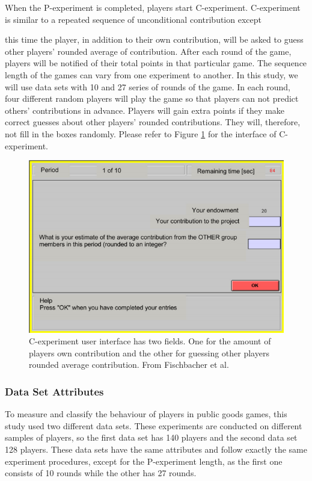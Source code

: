 When the P-experiment is completed, players start C-experiment. C-experiment is similar to a repeated sequence of unconditional contribution except

this time the player, in addition to their own contribution, will be asked to guess other players' rounded average of contribution. After each round of the game, players will be notified of their total points in that particular game. The sequence length of the games can vary from one experiment to another. In this study, we will use data sets with 10 and 27 series of rounds of the game. In each round, four different random players will play the game so that players can not predict others' contributions in advance. Players will gain extra points if they make correct guesses about other players' rounded contributions. They will, therefore, not fill in the boxes
 randomly. Please refer to Figure \ref{fig:pgg10RoundOfGame} for the interface of C-experiment.

\begin{figure}[!h]
	\centering
	\includegraphics[scale=0.45]{images/chapter3/pgg10RoundOfGame.png}
	\caption{C-experiment user interface has two fields. One for the amount of players own contribution and the other for guessing other players rounded average contribution. From Fischbacher et al. \cite{Fischbacher2012}}
	\label{fig:pgg10RoundOfGame}
\end{figure}

\subsubsection{Data Set Attributes}

To measure and classify the behaviour of players in public goods games, this study used two different data sets. These experiments are conducted on different samples of players, so the first data set has 140 players and the second data set 128 players. These data sets have the same attributes and follow exactly the same experiment procedures, except for the P-experiment length, as the first one consists of 10 rounds while the other has 27 rounds.

